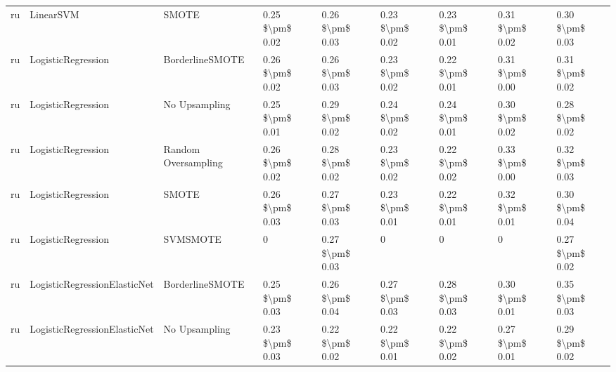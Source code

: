 \begin{tabular}{lllllllll}
      ru &                       LinearSVM &                         SMOTE &     0.25 \$\textbackslash pm\$ 0.02 &           0.26 \$\textbackslash pm\$ 0.03 &       0.23 \$\textbackslash pm\$ 0.02 &        0.23 \$\textbackslash pm\$ 0.01 &                         0.31 \$\textbackslash pm\$ 0.02 &     0.30 \$\textbackslash pm\$ 0.03 \\
      ru &              LogisticRegression &               BorderlineSMOTE &     0.26 \$\textbackslash pm\$ 0.02 &           0.26 \$\textbackslash pm\$ 0.03 &       0.23 \$\textbackslash pm\$ 0.02 &        0.22 \$\textbackslash pm\$ 0.01 &                         0.31 \$\textbackslash pm\$ 0.00 &     0.31 \$\textbackslash pm\$ 0.02 \\
      ru &              LogisticRegression &                 No Upsampling &     0.25 \$\textbackslash pm\$ 0.01 &           0.29 \$\textbackslash pm\$ 0.02 &       0.24 \$\textbackslash pm\$ 0.02 &        0.24 \$\textbackslash pm\$ 0.01 &                         0.30 \$\textbackslash pm\$ 0.02 &     0.28 \$\textbackslash pm\$ 0.02 \\
      ru &              LogisticRegression &           Random Oversampling &     0.26 \$\textbackslash pm\$ 0.02 &           0.28 \$\textbackslash pm\$ 0.02 &       0.23 \$\textbackslash pm\$ 0.02 &        0.22 \$\textbackslash pm\$ 0.02 &                         0.33 \$\textbackslash pm\$ 0.00 &     0.32 \$\textbackslash pm\$ 0.03 \\
      ru &              LogisticRegression &                         SMOTE &     0.26 \$\textbackslash pm\$ 0.03 &           0.27 \$\textbackslash pm\$ 0.03 &       0.23 \$\textbackslash pm\$ 0.01 &        0.22 \$\textbackslash pm\$ 0.01 &                         0.32 \$\textbackslash pm\$ 0.01 &     0.30 \$\textbackslash pm\$ 0.04 \\
      ru &              LogisticRegression &                      SVMSMOTE &                   0 &           0.27 \$\textbackslash pm\$ 0.03 &                     0 &                      0 &                                       0 &     0.27 \$\textbackslash pm\$ 0.02 \\
      ru &    LogisticRegressionElasticNet &               BorderlineSMOTE &     0.25 \$\textbackslash pm\$ 0.03 &           0.26 \$\textbackslash pm\$ 0.04 &       0.27 \$\textbackslash pm\$ 0.03 &        0.28 \$\textbackslash pm\$ 0.03 &                         0.30 \$\textbackslash pm\$ 0.01 &     0.35 \$\textbackslash pm\$ 0.03 \\
      ru &    LogisticRegressionElasticNet &                 No Upsampling &     0.23 \$\textbackslash pm\$ 0.03 &           0.22 \$\textbackslash pm\$ 0.02 &       0.22 \$\textbackslash pm\$ 0.01 &        0.22 \$\textbackslash pm\$ 0.02 &                         0.27 \$\textbackslash pm\$ 0.01 &     0.29 \$\textbackslash pm\$ 0.02 \\

\end{tabular}
